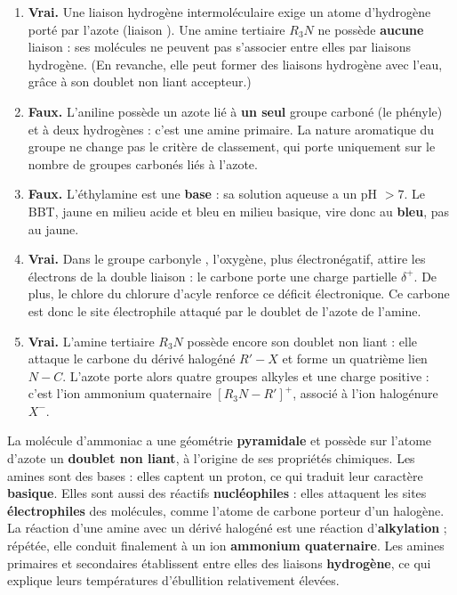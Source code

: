 \documentclass[11pt]{article}
\newcommand{\cle}[1]{{\popxbold\color{popdark}#1}}
\begin{document}
\begin{corrige}
\begin{enumerate}
\item \textbf{Vrai.} Une liaison hydrogène intermoléculaire exige un atome d'hydrogène porté par l'azote (liaison ). Une amine tertiaire $R_3N$ ne possède \textbf{aucune} liaison  : ses molécules ne peuvent pas s'associer entre elles par liaisons hydrogène. (En revanche, elle peut former des liaisons hydrogène avec l'eau, grâce à son doublet non liant accepteur.)
\item \textbf{Faux.} L'aniline  possède un azote lié à \textbf{un seul} groupe carboné (le phényle) et à deux hydrogènes : c'est une amine \cle{primaire}. La nature aromatique du groupe ne change pas le critère de classement, qui porte uniquement sur le nombre de groupes carbonés liés à l'azote.
\item \textbf{Faux.} L'éthylamine est une \textbf{base} : sa solution aqueuse a un pH $> 7$. Le BBT, jaune en milieu acide et bleu en milieu basique, vire donc au \textbf{bleu}, pas au jaune.
\item \textbf{Vrai.} Dans le groupe carbonyle , l'oxygène, plus électronégatif, attire les électrons de la double liaison : le carbone porte une charge partielle $\delta^+$. De plus, le chlore du chlorure d'acyle renforce ce déficit électronique. Ce carbone est donc le site \cle{électrophile} attaqué par le doublet de l'azote de l'amine.
\item \textbf{Vrai.} L'amine tertiaire $R_3N$ possède encore son doublet non liant : elle attaque le carbone du dérivé halogéné $R'\!-\!X$ et forme un quatrième lien $N\!-\!C$. L'azote porte alors quatre groupes alkyles et une charge positive : c'est l'ion \cle{ammonium quaternaire} $[R_3N-R']^+$, associé à l'ion halogénure $X^-$.
\end{enumerate}
\end{corrige}

\begin{corrige}
La molécule d'ammoniac a une géométrie \textbf{pyramidale} et possède sur l'atome d'azote un \textbf{doublet non liant}, à l'origine de ses propriétés chimiques. Les amines sont des bases : elles captent un proton, ce qui traduit leur caractère \textbf{basique}. Elles sont aussi des réactifs \textbf{nucléophiles} : elles attaquent les sites \textbf{électrophiles} des molécules, comme l'atome de carbone porteur d'un halogène. La réaction d'une amine avec un dérivé halogéné est une réaction d'\textbf{alkylation} ; répétée, elle conduit finalement à un ion \textbf{ammonium quaternaire}. Les amines primaires et secondaires établissent entre elles des liaisons \textbf{hydrogène}, ce qui explique leurs températures d'ébullition relativement élevées.
\end{corrige}
\end{document}
